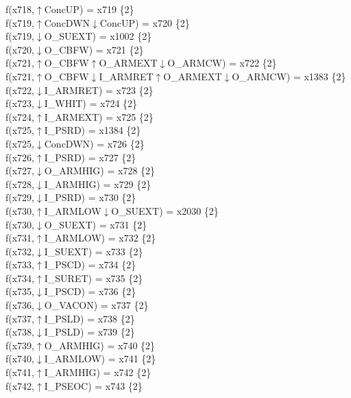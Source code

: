 f(x718,$\uparrow$ConcUP) = x719 \{2\} \\  
f(x719,$\uparrow$ConcDWN$\downarrow$ConcUP) = x720 \{2\} \\  
f(x719,$\downarrow$O\_SUEXT) = x1002 \{2\} \\  
f(x720,$\downarrow$O\_CBFW) = x721 \{2\} \\  
f(x721,$\uparrow$O\_CBFW$\uparrow$O\_ARMEXT$\downarrow$O\_ARMCW) = x722 \{2\} \\  
f(x721,$\uparrow$O\_CBFW$\downarrow$I\_ARMRET$\uparrow$O\_ARMEXT$\downarrow$O\_ARMCW) = x1383 \{2\} \\  
f(x722,$\downarrow$I\_ARMRET) = x723 \{2\} \\  
f(x723,$\downarrow$I\_WHIT) = x724 \{2\} \\  
f(x724,$\uparrow$I\_ARMEXT) = x725 \{2\} \\  
f(x725,$\uparrow$I\_PSRD) = x1384 \{2\} \\  
f(x725,$\downarrow$ConcDWN) = x726 \{2\} \\  
f(x726,$\uparrow$I\_PSRD) = x727 \{2\} \\  
f(x727,$\downarrow$O\_ARMHIG) = x728 \{2\} \\  
f(x728,$\downarrow$I\_ARMHIG) = x729 \{2\} \\  
f(x729,$\downarrow$I\_PSRD) = x730 \{2\} \\  
f(x730,$\uparrow$I\_ARMLOW$\downarrow$O\_SUEXT) = x2030 \{2\} \\  
f(x730,$\downarrow$O\_SUEXT) = x731 \{2\} \\  
f(x731,$\uparrow$I\_ARMLOW) = x732 \{2\} \\  
f(x732,$\downarrow$I\_SUEXT) = x733 \{2\} \\  
f(x733,$\uparrow$I\_PSCD) = x734 \{2\} \\  
f(x734,$\uparrow$I\_SURET) = x735 \{2\} \\  
f(x735,$\downarrow$I\_PSCD) = x736 \{2\} \\  
f(x736,$\downarrow$O\_VACON) = x737 \{2\} \\  
f(x737,$\uparrow$I\_PSLD) = x738 \{2\} \\  
f(x738,$\downarrow$I\_PSLD) = x739 \{2\} \\  
f(x739,$\uparrow$O\_ARMHIG) = x740 \{2\} \\  
f(x740,$\downarrow$I\_ARMLOW) = x741 \{2\} \\  
f(x741,$\uparrow$I\_ARMHIG) = x742 \{2\} \\  
f(x742,$\uparrow$I\_PSEOC) = x743 \{2\} \\  
